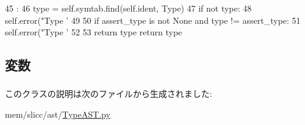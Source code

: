 \begin{DoxyCode}
45                                     :
46         type = self.symtab.find(self.ident, Type)
47         if not type:
48             self.error("Type '%
49 
50         if assert_type is not None and type != assert_type:
51             self.error("Type '%
52 
53         return type
        return type
\end{DoxyCode}


\subsection{変数}
\hypertarget{classslicc_1_1ast_1_1TypeAST_1_1TypeAST_a2fe57e2d3d2cba9a3aeba2f629eaa78b}{
\subsubsection[{ident}]{}}
\label{classslicc_1_1ast_1_1TypeAST_1_1TypeAST_a2fe57e2d3d2cba9a3aeba2f629eaa78b}


このクラスの説明は次のファイルから生成されました:\begin{DoxyCompactItemize}
\item 
mem/slicc/ast/\hyperlink{TypeAST_8py}{TypeAST.py}\end{DoxyCompactItemize}
